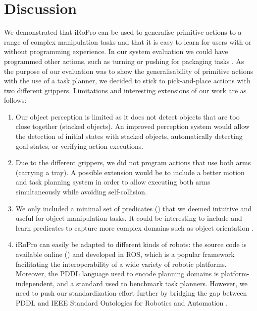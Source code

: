\section{Discussion}
\label{sec:discussion}
We demonstrated that iRoPro can be used to generalise primitive actions to a range of complex manipulation tasks and that it is easy to learn for users with or without programming experience.
In our system evaluation we could have programmed other actions, such as turning or pushing for packaging tasks \cite{liang2018c}.
As the purpose of our evaluation was to show the generalisability of primitive actions with the use of a task planner, we decided to stick to pick-and-place actions with two different grippers. 
Limitations and interesting extensions of our work are as follows:
\begin{enumerate}
	\item Our object perception is limited as it does not detect objects that are too close together (\eg stacked objects).
	An improved perception system would allow the detection of initial states with stacked objects, automatically detecting goal states, or verifying action executions.
	\item Due to the different grippers, we did not program actions that use both arms (\eg carrying a tray). A possible extension would be to include a better motion and task planning system in order to allow executing both arms simultaneously while avoiding self-collision.
	\item We only included a minimal set of predicates () that we deemed intuitive and useful for object manipulation tasks.
	It could be interesting to include and learn predicates to capture more complex domains such as object orientation \cite{li2016learning}.
	\item iRoPro can easily be adapted to different kinds of robots: the source code is available online () and developed in ROS, which is a popular framework facilitating the interoperability of a wide variety of robotic platforms. Moreover, the PDDL language used to encode planning domains is platform-independent, and a standard used to benchmark task planners. However, we need to push our standardization effort further by bridging the gap between PDDL and IEEE Standard Ontologies for Robotics and Automation \cite{8172300}.
\end{enumerate}

